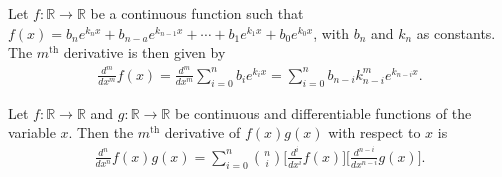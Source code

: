 \begin{fancybox}{}
	Let $f:\mathbb{R}\rightarrow\mathbb{R}$ be a continuous function such that $f(x)=b_n e^{k_n x}+b_{n-a}e^{k_{n-1}x}+\cdots+b_1e^{k_1x}+b_0e^{k_0x}$, with $b_n$ and $k_n$ as constants. The $m^\textrm{th}$ derivative is then given by
	\begin{align}
	\frac{d^m}{dx^m}f(x)=\frac{d^m}{dx^m}\sum_{i=0}^{n}b_ie^{k_ix}=\sum_{i=0}^{n}b_{n-i} k_{n-i}^m e^{k_{n-i} x}.
	\end{align}
\end{fancybox}


\newpage
\begin{fancybox}{}
	Let $f:\mathbb{R}\rightarrow\mathbb{R}$ and $g:\mathbb{R}\rightarrow\mathbb{R}$ be continuous and differentiable functions of the variable $x$. Then the $m^{\textrm{th}}$ derivative of $f(x)g(x)$ with respect to $x$ is
	\begin{align*}
	\frac{d^n}{dx^n}f(x)g(x)=\sum_{i=0}^{n}{{n}\choose{i}}\bigg[\frac{d^i}{dx^i}f(x) \bigg]\bigg[\frac{d^{n-i}}{dx^{n-i}}g(x) \bigg].
	\end{align*}
\end{fancybox}




